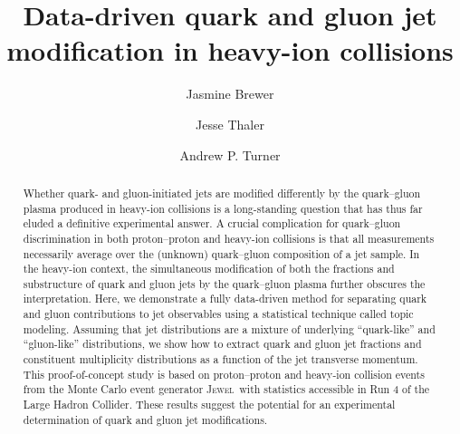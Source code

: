 \documentclass[aps,prl,twocolumn,preprintnumbers,showpacs,floatfix,nofootinbib]{revtex4-1}
\newcommand*{\jewel}{\textsc{Jewel}}
\begin{document}

\title{Data-driven quark and gluon jet modification in heavy-ion collisions}
%
\author{Jasmine Brewer}
%
\author{Jesse Thaler}
%
\author{Andrew P. Turner}
%


\begin{abstract}
%
Whether quark- and gluon-initiated jets are modified differently by the quark--gluon plasma produced in heavy-ion collisions is a long-standing question that has thus far eluded a definitive experimental answer.
%
A crucial complication for quark--gluon discrimination in both proton--proton and heavy-ion collisions is that all measurements necessarily average over the (unknown) quark--gluon composition of a jet sample.
%
In the heavy-ion context, the simultaneous modification of both the fractions and substructure of quark and gluon jets by the quark--gluon plasma further obscures the interpretation.
%
Here, we demonstrate a fully data-driven method for separating quark and gluon contributions to jet observables using a statistical technique called topic modeling.
%
Assuming that jet distributions are a mixture of underlying ``quark-like'' and ``gluon-like'' distributions, we show how to extract quark and gluon jet fractions and constituent multiplicity distributions as a function of the jet transverse momentum.
%
This proof-of-concept study is based on proton--proton and heavy-ion collision events from the Monte Carlo event generator \jewel\ with statistics accessible in Run 4 of the Large Hadron Collider.
%
These results suggest the potential for an experimental determination of quark and gluon jet modifications.
%
\end{abstract}

\maketitle

\end{document}
